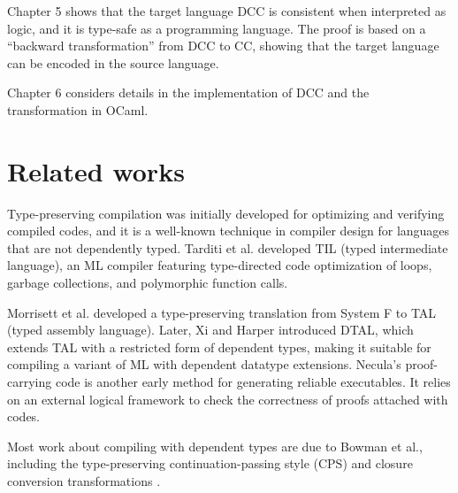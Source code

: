 Chapter 5 shows that the target language DCC is consistent when interpreted as logic, and it is type-safe as a programming language. The proof is based on a ``backward transformation'' from DCC to CC, showing that the target language can be encoded in the source language.

Chapter 6 considers details in the implementation of DCC and the transformation in OCaml.

\section{Related works}

Type-preserving compilation was initially developed for optimizing and verifying compiled codes, and it is a well-known technique in compiler design for languages that are not dependently typed. Tarditi et al. \cite{tarditi1996til} developed TIL (typed intermediate language), an ML compiler featuring type-directed code optimization of loops, garbage collections, and polymorphic function calls. 

Morrisett et al. \cite{morrisett1999system} developed a type-preserving translation from System F to TAL (typed assembly language). Later, Xi and Harper \cite{xi2001dependently} introduced DTAL, which extends TAL with a restricted form of dependent types, making it suitable for compiling a variant of ML with dependent datatype extensions. Necula’s proof-carrying code \cite{necula1997proof} is another early method for generating reliable executables. It relies on an external logical framework to check the correctness of proofs attached with codes.

Most work about compiling with dependent types are due to Bowman et al., including the type-preserving continuation-passing style (CPS) and closure conversion transformations \cite{bowman2017type,bowman2018typed}.


